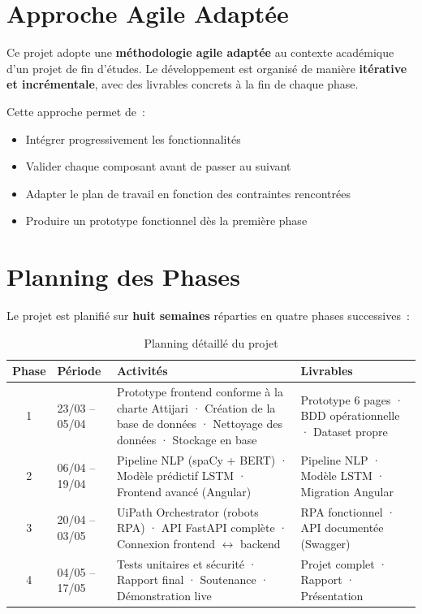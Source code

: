 \documentclass[12pt,a4paper]{report}
\begin{document}
\section{Approche Agile Adaptée}

Ce projet adopte une \textbf{méthodologie agile adaptée} au contexte académique d'un projet de fin d'études. Le développement est organisé de manière \textbf{itérative et incrémentale}, avec des livrables concrets à la fin de chaque phase.

Cette approche permet de~:
\begin{itemize}[noitemsep]
    \item Intégrer progressivement les fonctionnalités
    \item Valider chaque composant avant de passer au suivant
    \item Adapter le plan de travail en fonction des contraintes rencontrées
    \item Produire un prototype fonctionnel dès la première phase
\end{itemize}

\section{Planning des Phases}

Le projet est planifié sur \textbf{huit semaines} réparties en quatre phases successives~:

\begin{table}[H]
\centering
\caption{Planning détaillé du projet}
\begin{tabularx}{\textwidth}{|c|l|X|X|}
\hline
\textbf{Phase} & \textbf{Période} & \textbf{Activités} & \textbf{Livrables} \\
\hline
1 & 23/03 -- 05/04 & Prototype frontend conforme à la charte Attijari · Création de la base de données · Nettoyage des données · Stockage en base & Prototype 6 pages · BDD opérationnelle · Dataset propre \\
\hline
2 & 06/04 -- 19/04 & Pipeline NLP (spaCy + BERT) · Modèle prédictif LSTM · Frontend avancé (Angular) & Pipeline NLP · Modèle LSTM · Migration Angular \\
\hline
3 & 20/04 -- 03/05 & UiPath Orchestrator (robots RPA) · API FastAPI complète · Connexion frontend $\leftrightarrow$ backend & RPA fonctionnel · API documentée (Swagger) \\
\hline
4 & 04/05 -- 17/05 & Tests unitaires et sécurité · Rapport final · Soutenance · Démonstration live & Projet complet · Rapport · Présentation \\
\hline
\end{tabularx}
\end{table}
\end{document}

